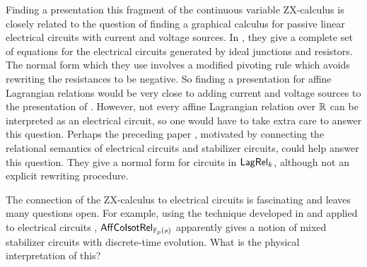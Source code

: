 Finding a presentation this fragment of the  continuous variable ZX-calculus is closely related to the question of finding a graphical calculus for passive linear electrical circuits with current and voltage sources.  In \cite{amolak}, they give a complete set of equations for the electrical circuits generated by ideal junctions and resistors.  The normal form which they use involves a modified pivoting rule which avoids rewriting the resistances to be negative.  
  So finding a presentation for affine Lagrangian relations would be very close to adding current and voltage sources to the presentation of \cite{amolak}. However, not every affine Lagrangian relation over $\mathbb{R}$ can be interpreted as an electrical circuit, so one would have to take extra care to answer this question. Perhaps the preceding paper \cite{kirch}, motivated by connecting the relational semantics of electrical circuits and stabilizer circuits, could help answer this question. They give a normal form for circuits in $\mathsf{Lag}\mathsf{Rel}_k$, although not an explicit rewriting procedure.

The connection of the ZX-calculus to electrical circuits is fascinating and leaves many questions open.  For example, using the technique developed in \cite{control} and applied to electrical circuits \cite{network}, $\mathsf{Aff}{\sf Co}{\sf Isot}\mathsf{Rel}_{\mathbb{F}_p(s)}$ apparently gives a notion of mixed stabilizer circuits with discrete-time evolution.  What is the physical interpretation of this?



%


